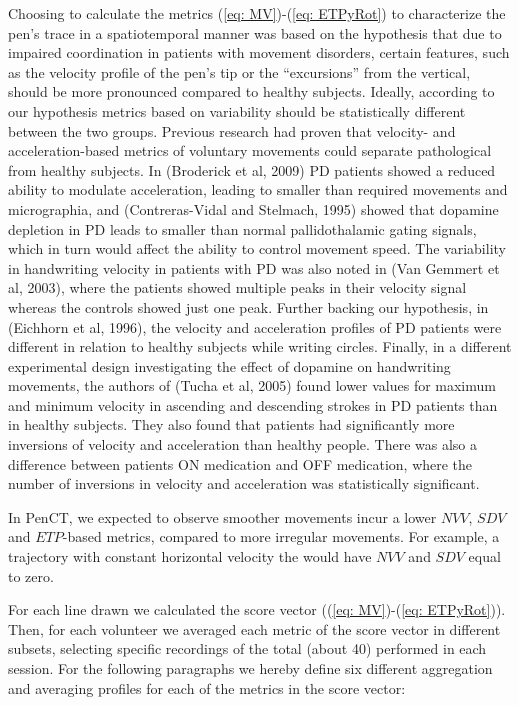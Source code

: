 Choosing to calculate the metrics (\ref{eq: MV})-(\ref{eq: ETPyRot}) to characterize the pen's trace in a spatiotemporal manner was based on the hypothesis that due to impaired coordination in patients with movement disorders, certain features, such as the velocity profile of the pen's tip or the ``excursions'' from the vertical, should be more pronounced compared to healthy subjects. Ideally, according to our hypothesis metrics based on variability should be statistically different between the two groups. Previous research had proven that velocity- and acceleration-based metrics of voluntary movements could separate pathological from healthy subjects. In (Broderick et al, 2009) \gls{PD} patients showed a reduced ability to modulate acceleration, leading to smaller than required movements and micrographia, and (Contreras-Vidal and Stelmach, 1995) showed  that dopamine depletion in \gls{PD} leads to smaller than normal pallidothalamic gating signals, which in turn would affect the ability to control movement speed. The variability in handwriting velocity in patients with \gls{PD} was also noted in (Van Gemmert et al, 2003), where the patients showed multiple peaks in their velocity signal whereas the controls showed just one peak. Further backing our hypothesis, in (Eichhorn et al, 1996), the velocity and acceleration profiles of \gls{PD} patients were different in relation to healthy subjects while writing circles. Finally, in a different experimental design investigating the effect of dopamine on handwriting movements, the authors of (Tucha et al, 2005) found lower values for maximum and minimum velocity in ascending and descending strokes in \gls{PD} patients than in healthy subjects. They also found that patients had significantly more inversions of velocity and acceleration than healthy people. There was also a difference between patients ON medication and OFF medication, where the number of inversions in velocity and acceleration was statistically significant. 

In \gls{PenCT}, we expected to observe smoother movements incur a lower $NVV$, $SDV$ and $ETP$-based metrics, compared to more irregular movements. For example, a trajectory with constant horizontal velocity the would have $NVV$ and $SDV$ equal to zero.

For each line drawn we calculated the score vector ((\ref{eq: MV})-(\ref{eq: ETPyRot})). Then, for each volunteer we averaged each metric of the score vector in different subsets, selecting specific recordings of the total (about 40) performed in each session. 
For the following paragraphs we hereby define six different aggregation and averaging profiles for each of the metrics in the score vector: 

